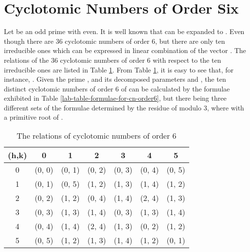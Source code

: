 \documentclass[letter]{ieice}
\begin{document}
\section{Cyclotomic Numbers of Order Six }\label{sec 2}
Let  be an odd prime with  even. It is well known that  can be expanded to . Even though there are 36 cyclotomic numbers of order 6, but there are only ten irreducible ones which can be expressed in linear combination of the vector  \cite{ar01,ar02}. The relations of the 36 cyclotomic numbers of order 6 with respect to the ten irreducible ones are listed in Table \ref{lab-table-cyclotomic-number-order6}. From Table \ref{lab-table-cyclotomic-number-order6}, it is easy to see that, for instance, . Given the prime , and its decomposed parameters  and , the ten distinct cyclotomic numbers of order 6 of  can be calculated by the formulae exhibited in Table \ref{lab-table-formulae-for-cn-order6}, but there being three different sets of the formulae determined by the residue of  modulo 3, where  with  a primitive root of .
\begin{table}[tb]
\caption{The relations of cyclotomic numbers of order 6}
\label{lab-table-cyclotomic-number-order6}
{\renewcommand{\tabcolsep}{0.15cm}
\begin{center}
\begin{tabular}{|c|c|c|c|c|c|c|}
\hline
(h,k) & 0 & 1 & 2 & 3 & 4 & 5 \\
\hline
0 & (0, 0) & (0, 1) & (0, 2) & (0, 3) & (0, 4) & (0, 5) \\
\hline
1 & (0, 1) & (0, 5) & (1, 2) & (1, 3) & (1, 4) & (1, 2) \\
\hline
2 & (0, 2) & (1, 2) & (0, 4) & (1, 4) & (2, 4) & (1, 3) \\
\hline
3 & (0, 3) & (1, 3) & (1, 4) & (0, 3) & (1, 3) & (1, 4) \\
\hline
4 & (0, 4) & (1, 4) & (2, 4) & (1, 3) & (0, 2) & (1, 2) \\
\hline
5 & (0, 5) & (1, 2) & (1, 3) & (1, 4) & (1, 2) & (0, 1) \\
\hline
\end{tabular}
\end{center}
}
\end{table}
\end{document}
